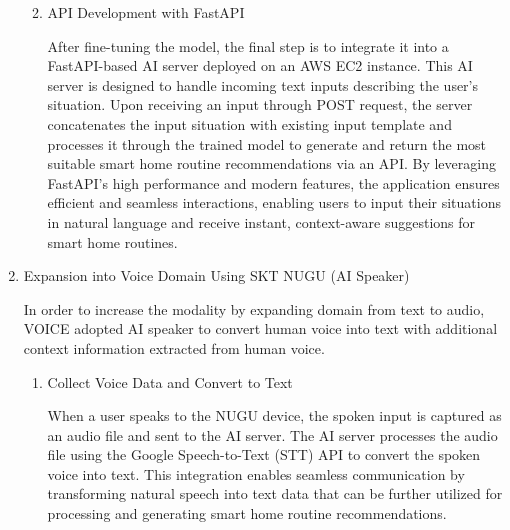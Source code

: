 \documentclass[conference]{IEEEtran}
\begin{document}
\begin{enumerate}[label=\arabic*]
\begin{enumerate}[label=\arabic*)]
        \vspace{0.5em}

        \item API Development with FastAPI\par
        \vspace{0.3em}
        After fine-tuning the model, the final step is to integrate it into a FastAPI-based AI server deployed on an AWS EC2 instance. This AI server is designed to handle incoming text inputs describing the user’s situation. Upon receiving an input through POST request, the server concatenates the input situation with existing input template and processes it through the trained model to generate and return the most suitable smart home routine recommendations via an API. By leveraging FastAPI’s high performance and modern features, the application ensures efficient and seamless interactions, enabling users to input their situations in natural language and receive instant, context-aware suggestions for smart home routines.
    \end{enumerate}

    \vspace{1em}

    \item Expansion into Voice Domain Using SKT NUGU (AI Speaker)\par
    \vspace{0.3em}
    In order to increase the modality by expanding domain from text to audio, VOICE adopted AI speaker to convert human voice into text with additional context information extracted from human voice. 
    \vspace{0.3em}

    \begin{enumerate}[label=\arabic*)] 
        \item Collect Voice Data and Convert to Text\par
        \vspace{0.3em}
        When a user speaks to the NUGU device, the spoken input is captured as an audio file and sent to the AI server. The AI server processes the audio file using the Google Speech-to-Text (STT) API to convert the spoken voice into text. This integration enables seamless communication by transforming natural speech into text data that can be further utilized for processing and generating smart home routine recommendations.

        \vspace{0.5em}


\end{enumerate}
\end{enumerate}
\end{document}
